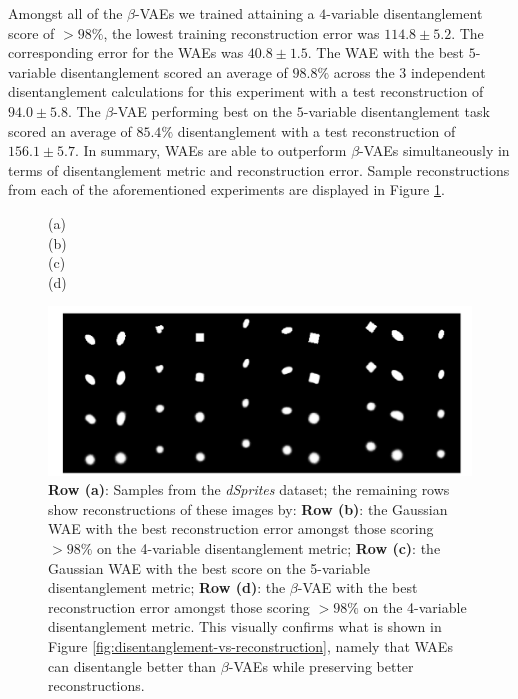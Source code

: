 \documentclass{article}
\begin{document}
Amongst all of the $\beta$-VAEs we trained attaining a $4$-variable disentanglement score of $>98\%$, the lowest training reconstruction error was $114.8\pm5.2$. 
The corresponding error for the WAEs was $40.8\pm 1.5$. 
The WAE with the best $5$-variable disentanglement scored an average of $\mathbf{98.8\%}$ across the 3 independent disentanglement calculations for this experiment with a test reconstruction of $94.0\pm5.8$. The $\beta$-VAE performing best on the $5$-variable disentanglement task scored an average of $\mathbf{85.4\%}$ disentanglement with a test reconstruction of $156.1\pm5.7$.
In summary, WAEs are able to outperform $\beta$-VAEs simultaneously in terms of disentanglement metric and reconstruction error.
Sample reconstructions from each of the aforementioned experiments are displayed in Figure \ref{fig:dsprites-reconstructions}.


\begin{figure}[t!]
	\centering
	\begin{minipage}{.02\textwidth}
		\vspace{0.6em}	(a) \\ \vspace{-0.1em} (b) \\\vspace{-0.1em} (c) \\ \vspace{-0.3em} (d)
	\end{minipage}
	\begin{minipage}{.45\textwidth}
		\centering
		\includegraphics[width=\columnwidth]{all} 
	\end{minipage}%
	\caption{\label{fig:dsprites-reconstructions}\textbf{Row (a)}: Samples from the \emph{dSprites} dataset; the remaining rows show reconstructions of these images by: \textbf{Row (b)}: the Gaussian WAE with the best reconstruction error amongst those scoring $>98\%$ on the 4-variable disentanglement metric; \textbf{Row (c)}: the Gaussian WAE with the best score on the 5-variable disentanglement metric; \textbf{Row (d)}: the  $\beta$-VAE with the best reconstruction error amongst those scoring $>98\%$ on the 4-variable disentanglement metric. This visually confirms what is shown in Figure \ref{fig:disentanglement-vs-reconstruction}, namely that WAEs can disentangle better than $\beta$-VAEs while preserving better reconstructions.}
\end{figure}
\end{document}
